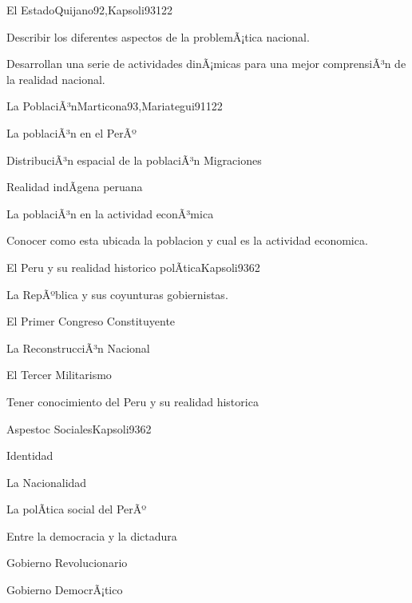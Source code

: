 \begin{syllabus}
\begin{unit}{El Estado}{Quijano92,Kapsoli93}{12}{2}
\begin{unitgoals}
      \item Describir los diferentes aspectos de la problemÃ¡tica nacional.
      \item Desarrollan una serie de actividades dinÃ¡micas para una mejor comprensiÃ³n de la realidad nacional.
   \end{unitgoals}
\end{unit}

\begin{unit}{La PoblaciÃ³n}{Marticona93,Mariategui91}{12}{2}
\begin{topics}
	\item La poblaciÃ³n en el PerÃº
	\item DistribuciÃ³n espacial de la poblaciÃ³n Migraciones
	\item Realidad indÃ­gena peruana
	\item La poblaciÃ³n en la actividad econÃ³mica
\end{topics}

\begin{unitgoals}
      \item Conocer como esta ubicada la poblacion y cual es la actividad economica.
   \end{unitgoals}
\end{unit}

\begin{unit}{El Peru y su realidad historico polÃ­tica}{Kapsoli93}{6}{2}
\begin{topics}
	\item La RepÃºblica y sus coyunturas gobiernistas.
	\item El Primer Congreso Constituyente
	\item La ReconstrucciÃ³n Nacional
	\item El Tercer Militarismo
\end{topics}

\begin{unitgoals}
      \item Tener conocimiento del Peru y su realidad historica
\end{unitgoals}
\end{unit}

\begin{unit}{Aspestoc Sociales}{Kapsoli93}{6}{2}
\begin{topics}
	\item Identidad
	\item La Nacionalidad
	\item La polÃ­tica social del PerÃº
	\item Entre la democracia y la dictadura
	\item Gobierno Revolucionario
	\item Gobierno DemocrÃ¡tico
\end{topics}


\end{unit}
\end{syllabus}

